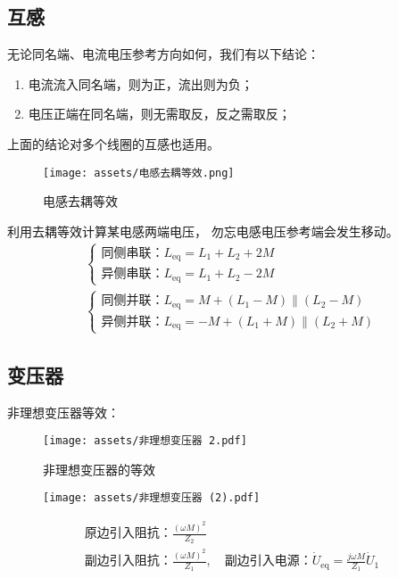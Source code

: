 \documentclass[a4paper]{article}  %
\theoremstyle{MyLineTheoremStyle} %
\theoremstyle{MyBlockTheoremStyle} %
\theoremstyle{MySubsubsectionStyle} %
\begin{document}
\begin{multicols*}{4}
\subsection{互感}

无论同名端、电流电压参考方向如何，我们有以下结论：
\begin{enumerate}
\item 电流流入同名端，则为正，流出则为负；
\item 电压正端在同名端，则无需取反，反之需取反；
\end{enumerate}
上面的结论对多个线圈的互感也适用。

\begin{figure}[H]\centering
    \texttt{[image: assets/电感去耦等效.png]}
    \caption{电感去耦等效}
    \label{电感去耦等效}
\end{figure}

利用去耦等效计算某电感两端电压，{\color{red} 勿忘电感电压参考端会发生移动}。
\begin{gather}
    \begin{cases}
    \text{同侧串联：} L_{\text{eq}} = L_1 + L_2 + 2M \\
    \text{异侧串联：} L_{\text{eq}} = L_1 + L_2 - 2M
    \end{cases} \\
    \begin{cases}
    \text{同侧并联：} L_{\text{eq}} = M + (L_1 - M)\parallel(L_2 - M)\\
    \text{异侧并联：} L_{\text{eq}} = -M + (L_1 + M)\parallel(L_2 + M)
    \end{cases}
\end{gather}

\subsection{变压器}
非理想变压器等效：
\begin{figure}[H]\centering
    \texttt{[image: assets/非理想变压器 2.pdf]}
    \caption{非理想变压器的等效}
    \label{非理想变压器等效}
\end{figure}
\begin{figure}[H]\centering
    \texttt{[image: assets/非理想变压器 (2).pdf]}
\end{figure}

\begin{gather}
\text{原边引入阻抗：} \frac{(\omega M)^2}{Z_2} \\
\text{副边引入阻抗：} \frac{(\omega M)^2}{Z_1},\quad 
\text{副边引入电源：} \dot{U}_{\text{eq}} = \frac{j \omega M}{Z_1} \dot{U}_1
\end{gather}


\end{multicols*}
\end{document}
